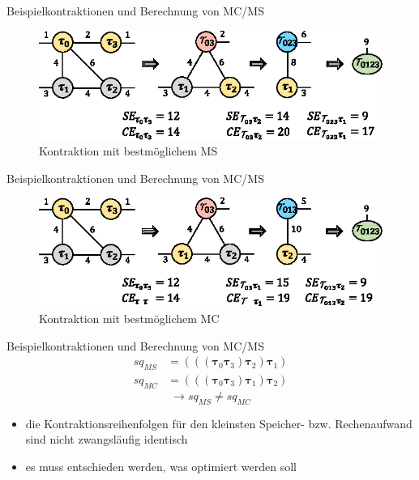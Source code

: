 \documentclass{beamer}
\begin{document}
		\begin{frame}{Beispielkontraktionen und Berechnung von MC/MS}
			\begin{figure}
				\includegraphics{figure_03_c}
				\caption*{Kontraktion mit bestmöglichem MS}
			\end{figure}
		\end{frame}

		\begin{frame}{Beispielkontraktionen und Berechnung von MC/MS}
			\begin{figure}
				\includegraphics{figure_03_d}
				\caption*{Kontraktion mit bestmöglichem MC}
			\end{figure}
		\end{frame}

		\begin{frame}{Beispielkontraktionen und Berechnung von MC/MS}
			\begin{align*}
				sq_{MS} &= (((\bm{\tau}_{0} \bm{\tau}_{3}) \bm{\tau}_{2}) \bm{\tau}_{1}) \\
				sq_{MC} &= (((\bm{\tau}_{0} \bm{\tau}_{3}) \bm{\tau}_{1}) \bm{\tau}_{2})
			\end{align*}
			\begin{equation*}
				\rightarrow sq_{MS} \neq sq_{MC}
			\end{equation*}
			\begin{itemize}
				\item die Kontraktionsreihenfolgen für den kleinsten Speicher- bzw. Rechenaufwand sind nicht zwangsläufig identisch
				\item es muss entschieden werden, was optimiert werden soll
			\end{itemize}
		\end{frame}
\end{document}
